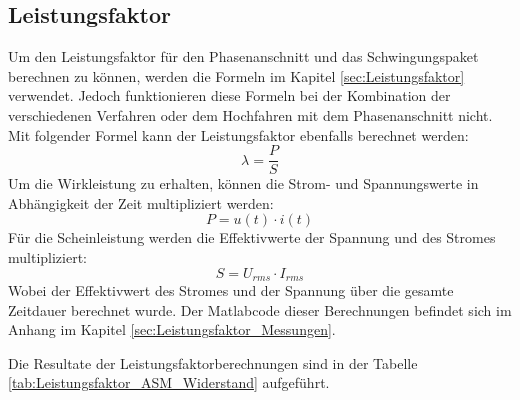 \newpage
\subsection{Leistungsfaktor}
Um den Leistungsfaktor für den Phasenanschnitt und das Schwingungspaket berechnen zu können, werden die Formeln im Kapitel \ref{sec:Leistungsfaktor} verwendet. Jedoch funktionieren diese Formeln bei der Kombination der verschiedenen Verfahren oder dem Hochfahren mit dem Phasenanschnitt nicht. Mit folgender Formel kann der Leistungsfaktor ebenfalls berechnet werden:
\begin{equation}
\lambda = \frac{P}{S}
\end{equation}
Um die Wirkleistung zu erhalten, können die Strom- und Spannungswerte in Abhängigkeit der Zeit  multipliziert werden:
\begin{equation}
P = u(t) \cdot i(t)
\end{equation}
Für die Scheinleistung werden die Effektivwerte der Spannung und des Stromes multipliziert:
\begin{equation}
S = U_{rms} \cdot I_{rms}
\end{equation}
Wobei der Effektivwert des Stromes und der Spannung über die gesamte Zeitdauer berechnet wurde. Der Matlabcode dieser Berechnungen befindet sich im Anhang im Kapitel \ref{sec:Leistungsfaktor_Messungen}. 

Die Resultate der Leistungsfaktorberechnungen sind in der Tabelle \ref{tab:Leistungsfaktor_ASM_Widerstand} aufgeführt.

